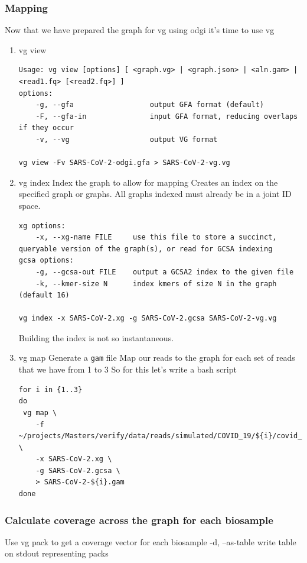 \documentclass[a4paper]{article}
\begin{document}
\subsubsection{Mapping}
\label{sec:org1459eec}
Now that we have prepared the graph for vg using odgi it’s time to use vg
\begin{enumerate}
\item vg view
\label{sec:org8540d7b}
\begin{verbatim}
Usage: vg view [options] [ <graph.vg> | <graph.json> | <aln.gam> | <read1.fq> [<read2.fq>] ]
options:
    -g, --gfa                  output GFA format (default)
    -F, --gfa-in               input GFA format, reducing overlaps if they occur
    -v, --vg                   output VG format

vg view -Fv SARS-CoV-2-odgi.gfa > SARS-CoV-2-vg.vg
\end{verbatim}

\item vg index
\label{sec:org21a004c}
Index the graph to allow for mapping
Creates an index on the specified graph or graphs. All graphs indexed must
already be in a joint ID space.

\begin{verbatim}
xg options:
    -x, --xg-name FILE     use this file to store a succinct, queryable version of the graph(s), or read for GCSA indexing
gcsa options:
    -g, --gcsa-out FILE    output a GCSA2 index to the given file
    -k, --kmer-size N      index kmers of size N in the graph (default 16)

vg index -x SARS-CoV-2.xg -g SARS-CoV-2.gcsa SARS-CoV-2-vg.vg
\end{verbatim}

Building the index is not so instantaneous.
\item vg map
\label{sec:org6085ede}
Generate a \texttt{gam} file
Map our reads to the graph for each set of reads that we have from 1 to 3 So for this let’s write a bash script

\begin{verbatim}
for i in {1..3}
do 
 vg map \
    -f ~/projects/Masters/verify/data/reads/simulated/COVID_19/${i}/covid_19_sim_${i}_interleaved.fastq \
    -x SARS-CoV-2.xg \
    -g SARS-CoV-2.gcsa \
    > SARS-CoV-2-${i}.gam
done
\end{verbatim}
\end{enumerate}

\subsubsection{Calculate coverage across the graph for each biosample}
\label{sec:orgc57b2a0}
Use vg pack to get a coverage vector for each biosample
-d, --as-table         write table on stdout representing packs
\end{document}
